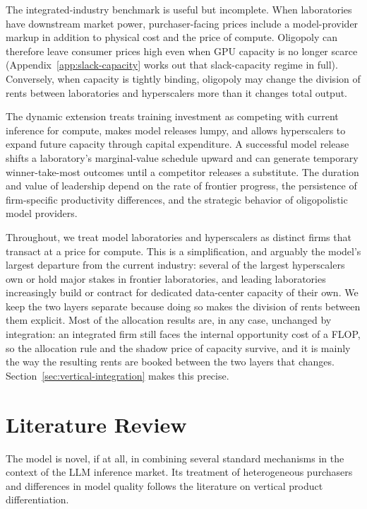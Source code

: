 \documentclass[11pt]{article}
\begin{document}
The integrated-industry benchmark is useful but incomplete. When laboratories have downstream market power, purchaser-facing prices include a model-provider markup in addition to physical cost and the price of compute. Oligopoly can therefore leave consumer prices high even when GPU capacity is no longer scarce (Appendix~\ref{app:slack-capacity} works out that slack-capacity regime in full). Conversely, when capacity is tightly binding, oligopoly may change the division of rents between laboratories and hyperscalers more than it changes total output.

The dynamic extension treats training investment as competing with current inference for compute, makes model releases lumpy, and allows hyperscalers to expand future capacity through capital expenditure. A successful model release shifts a laboratory's marginal-value schedule upward and can generate temporary winner-take-most outcomes until a competitor releases a substitute. The duration and value of leadership depend on the rate of frontier progress, the persistence of firm-specific productivity differences, and the strategic behavior of oligopolistic model providers.

Throughout, we treat model laboratories and hyperscalers as distinct firms that transact at a price for compute. This is a simplification, and arguably the model's largest departure from the current industry: several of the largest hyperscalers own or hold major stakes in frontier laboratories, and leading laboratories increasingly build or contract for dedicated data-center capacity of their own. We keep the two layers separate because doing so makes the division of rents between them explicit. Most of the allocation results are, in any case, unchanged by integration: an integrated firm still faces the internal opportunity cost of a FLOP, so the allocation rule and the shadow price of capacity survive, and it is mainly the way the resulting rents are booked between the two layers that changes. Section~\ref{sec:vertical-integration} makes this precise.

\section{Literature Review}
\label{sec:literature-review}

The model is novel, if at all, in combining several standard mechanisms in the context of the LLM inference market. Its treatment of heterogeneous purchasers and differences in model quality follows the literature on vertical product differentiation.
\end{document}
